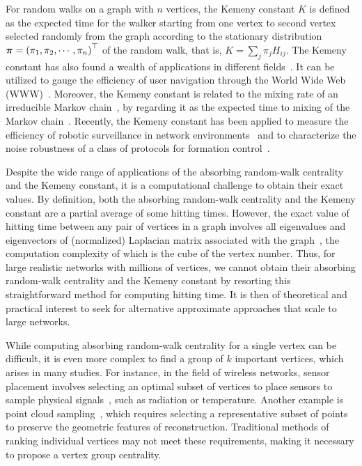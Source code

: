 \documentclass[10pt,journal,compsoc,twocolumn,twoside]{IEEEtran}
\begin{document}
For random walks on a graph with \(n\) vertices, the Kemeny constant \(K\) is defined as the expected time for the walker starting from one vertex to second vertex selected randomly from the graph according to the stationary distribution \(\boldsymbol{\pi}=\left(\pi_1, \pi_2, \cdots, \pi_n\right)^{\top}\) of the random walk, that is, \(K=\sum_{j} \pi_j H_{ij}\).
The Kemeny constant has also found a wealth of applications in different fields~\cite{Hu14}.
It can be utilized to gauge the efficiency of user navigation through the World Wide Web (WWW)~\cite{LeLo02}.
Moreover, the Kemeny constant is related to the mixing rate of an irreducible Markov chain~\cite{LePeWi09}, by regarding it as the expected time to mixing of the Markov chain~\cite{Hu06}.
Recently, the Kemeny constant has been applied to measure the efficiency of robotic surveillance in network environments~\cite{PaAgBu15} and to characterize the noise robustness of a class of protocols for formation control~\cite{JaOl15}.

Despite the wide range of applications of the absorbing random-walk centrality and the Kemeny constant, it is a computational challenge to obtain their exact values.
By definition, both the absorbing random-walk centrality and the Kemeny constant are a partial average of some hitting times.
However, the exact value of hitting time between any pair of vertices in a graph involves all eigenvalues and eigenvectors of (normalized) Laplacian matrix associated with the graph~\cite{Lo93,LiZh13PRE}, the computation complexity of which is the cube of the vertex number.
Thus, for large realistic networks with millions of vertices, we cannot obtain their absorbing random-walk centrality and the Kemeny constant by resorting this straightforward method for computing hitting time.
It is then of theoretical and practical interest to seek for alternative approximate approaches that scale to large networks.

While computing absorbing random-walk centrality for a single vertex can be difficult, it is even more complex to find a group of \(k\) important vertices, which arises in many studies.
For instance, in the field of wireless networks, sensor placement involves selecting an optimal subset of vertices to place sensors to sample physical signals~\cite{KrSiGu08,RaChVe13}, such as radiation or temperature.
Another example is point cloud sampling~\cite{DiChWaBa20,ChTiFeVeKo17}, which requires selecting a representative subset of points to preserve the geometric features of reconstruction.
Traditional methods of ranking individual vertices may not meet these requirements, making it necessary to propose a vertex group centrality.
\end{document}
